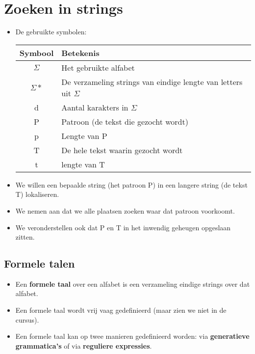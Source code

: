 \newcommand{\nonterminal}[1]{
    \langle \textbf{#1} \rangle
}

\chapter{Zoeken in strings}
\label{ch:zoeken_in_strings}
\begin{itemize}
    \item De gebruikte symbolen:

    \begin{table}[ht]
        \centering
        \begin{tabular}{c l}
            \hline
            Symbool & Betekenis \\
            \hline
            $\Sigma$ & Het gebruikte alfabet \\
            $\Sigma*$ & De verzameling strings van eindige lengte van letters uit $\Sigma$ \\
            d & Aantal karakters in $\Sigma$ \\
            P & Patroon (de tekst die gezocht wordt) \\
            p & Lengte van P \\
            T & De hele tekst waarin gezocht wordt\\
            t & lengte van T \\
            \hline
        \end{tabular}
    \end{table}

    \item We willen een bepaalde string (het patroon P) in een langere string (de tekst T) lokaliseren.
    \item We nemen aan dat we alle plaatsen zoeken waar dat patroon voorkoomt.
    \item We veronderstellen ook dat P en T in het inwendig geheugen opgeslaan zitten.
\end{itemize}


\section{Formele talen}
\begin{itemize}
    \item Een \textbf{formele taal} over een alfabet is een verzameling eindige strings over dat alfabet.
    \item Een formele taal wordt vrij vaag gedefinieerd (maar zien we niet in de cursus).
    \item Een formele taal kan op twee manieren gedefinieerd worden: via \textbf{generatieve grammatica's} of via \textbf{reguliere expressies}.
\end{itemize}

